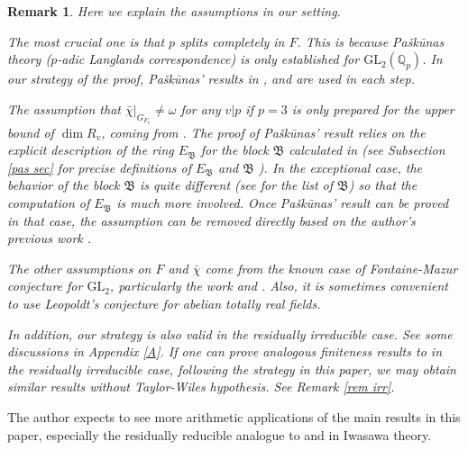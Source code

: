 \documentclass[a4paper, 12pt]{amsart}
\newtheorem{rem}[thm]{\bf Remark}
\newcommand{\Q}{\mathbb{Q}}
\newcommand{\GL}{\mathrm{GL}}
\newcommand{\kB}{\mathfrak{B}}
\begin{document}
    \begin{rem}
    	Here we explain the assumptions in our setting.
    	
    	The most crucial one is that $p$ splits completely in $F$. This is because Pašk\=unas theory ($p$-adic Langlands correspondence) is only established for $\GL_2(\Q_p)$. In our strategy of the proof, Pašk\=unas' results in \cite{Pa_k_nas_2013}, \cite{Pa_k_nas_2021} and \cite{Paskunas_2021} are used in each step.
    	
    	The assumption that $\bar{\chi}|_{G_{F_v}} \ne \omega$ for any $v|p$ if $p=3$ is only prepared for the upper bound of $\dim R_v$, coming from \cite[Corollary 5.13]{Paskunas_2021}. The proof of Pašk\=unas' result relies on the explicit description of the ring $E_\kB$ for the block $\kB$ calculated in \cite{Pa_k_nas_2013} (see Subsection \ref{pas sec} for precise definitions of $E_\kB$ and $\kB$ ). In the exceptional case, the behavior of the block $\kB$ is quite different (see \cite[Appendix A.2]{Zhang:2024aa} for the list of $\kB$) so that the computation of $E_\kB$ is much more involved. Once Pašk\=unas' result can be proved in that case, the assumption can be removed directly based on the author's previous work \cite{Zhang:2024aa}.
    	
    	The other assumptions on $F$ and $\bar{\chi}$ come from the known case of Fontaine-Mazur conjecture for $\GL_2$, particularly the work \cite{Skinner_1999} and \cite{pan2022fontaine}. Also, it is sometimes convenient to use Leopoldt's conjecture for abelian totally real fields.
    	
    	In addition, our strategy is also valid in the residually irreducible case. See some discussions in Appendix \ref{A}. If one can prove analogous finiteness results to \cite[Theorem 5.1.1 \& Theorem 6.1.1]{pan2022fontaine} in the residually irreducible case, following the strategy in this paper, we may obtain similar results without Taylor-Wiles hypothesis. See Remark \ref{rem irr}.
    \end{rem}

   The author expects to see more arithmetic applications of the main results in this paper, especially the residually reducible analogue to \cite{Nakamura2023} and \cite{Fouquet:2021aa} in Iwasawa theory.
\end{document}
